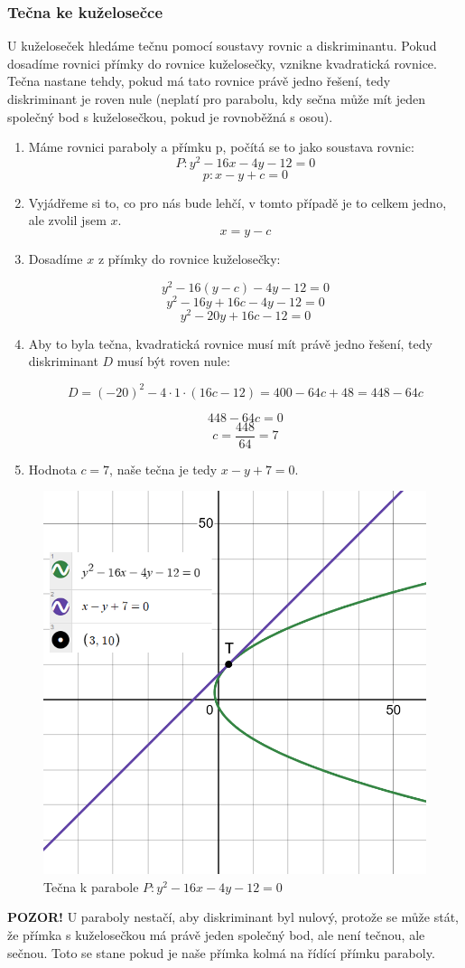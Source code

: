 \subsubsection{Tečna ke kuželosečce}
U kuželoseček hledáme tečnu pomocí soustavy rovnic a diskriminantu. Pokud dosadíme rovnici přímky do rovnice kuželosečky, vznikne kvadratická rovnice. Tečna nastane tehdy, pokud má tato rovnice právě jedno řešení, tedy diskriminant je roven nule (neplatí pro parabolu, kdy sečna může mít jeden společný bod s kuželosečkou, pokud je rovnoběžná s osou).

\begin{enumerate}
\item Máme rovnici paraboly a přímku p, počítá se to jako soustava rovnic:
\[
P: y^2 - 16x - 4y - 12 = 0
\]
\[
p: x - y + c = 0
\]
\item Vyjádřeme si to, co pro nás bude lehčí, v tomto případě je to celkem jedno, ale zvolil jsem \(x\).
\[x = y - c\]

\item Dosadíme \( x \) z přímky do rovnice kuželosečky:

\[
y^2 - 16(y - c) - 4y - 12 = 0
\]
\[
y^2 - 16y + 16c - 4y -12 = 0
\]
\[
y^2 - 20y + 16c - 12 = 0
\]

\item Aby to byla tečna, kvadratická rovnice musí mít právě jedno řešení, tedy diskriminant \( D \) musí být roven nule:

\[
D = (-20)^2 - 4 \cdot 1 \cdot (16c - 12) = 400 - 64c + 48 = 448 - 64c
\]

\[
448 - 64c = 0 
\]
\[
c = \frac{448}{64} = 7
\]

\item Hodnota \( c = 7 \), naše tečna je tedy \( x - y + 7 = 0 \).
\end{enumerate}
\begin{figure}[h]
    \centering
    \includegraphics[width=0.3\linewidth]{img/17_Tecna_k_parabole.png}
    \caption{Tečna k parabole \(P: y^2 - 16x - 4y - 12 = 0\)}
    \label{fig:enter-label}
\end{figure}
\textbf{POZOR!} U paraboly nestačí, aby diskriminant byl nulový, protože se může stát, že přímka s kuželosečkou má právě jeden společný bod, ale není tečnou, ale sečnou. Toto se stane pokud je naše přímka kolmá na řídící přímku paraboly.
